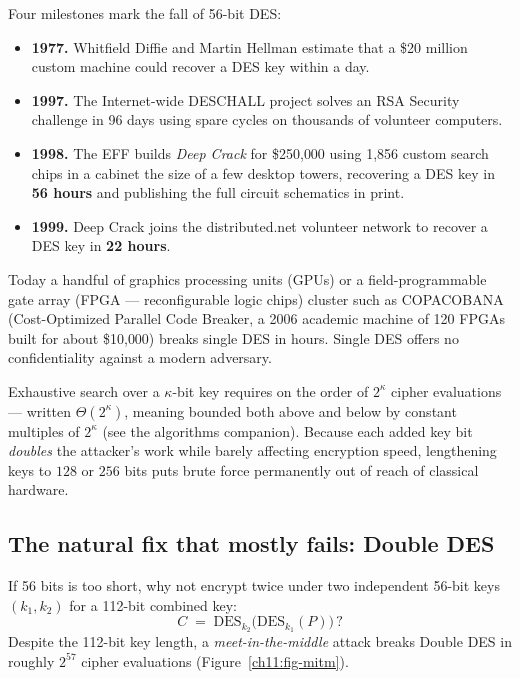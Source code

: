 Four milestones mark the fall of 56-bit DES:

\begin{itemize}
  \item \textbf{1977.} Whitfield Diffie and Martin Hellman estimate that a \$20 million custom machine could recover a DES key within a day.
  \item \textbf{1997.} The Internet-wide DESCHALL project solves an RSA Security challenge in 96 days using spare cycles on thousands of volunteer computers.
  \item \textbf{1998.} The EFF builds \emph{Deep Crack} for \$250{,}000 using 1{,}856 custom search chips in a cabinet the size of a few desktop towers, recovering a DES key in \textbf{56 hours} and publishing the full circuit schematics in print.
  \item \textbf{1999.} Deep Crack joins the distributed.net volunteer network to recover a DES key in \textbf{22 hours}.
\end{itemize}

Today a handful of graphics processing units (GPUs) or a field-programmable gate array (FPGA --- reconfigurable logic chips) cluster such as COPACOBANA (Cost-Optimized Parallel Code Breaker, a 2006 academic machine of 120 FPGAs built for about \$10{,}000) breaks single DES in hours. Single DES offers no confidentiality against a modern adversary.

\begin{connectionbox}
Exhaustive search over a $\kappa$-bit key requires on the order of $2^{\kappa}$ cipher evaluations --- written $\Theta(2^{\kappa})$, meaning bounded both above and below by constant multiples of $2^{\kappa}$ (see the algorithms companion). Because each added key bit \emph{doubles} the attacker's work while barely affecting encryption speed, lengthening keys to $128$ or $256$ bits puts brute force permanently out of reach of classical hardware.
\end{connectionbox}

\subsection{The natural fix that mostly fails: Double DES}
\label{ch11:mitm}

If 56 bits is too short, why not encrypt twice under two independent 56-bit keys $(k_1, k_2)$ for a 112-bit combined key:
\[
C \;=\; \mathrm{DES}_{k_2}\!\bigl(\mathrm{DES}_{k_1}(P)\bigr)\,?
\]
Despite the 112-bit key length, a \emph{meet-in-the-middle} attack breaks Double DES in roughly $2^{57}$ cipher evaluations (Figure~\ref{ch11:fig-mitm}).


